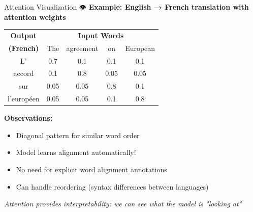 \documentclass[aspectratio=169]{beamer}
\begin{document}
\begin{frame}{Attention Visualization 👁️}
\textbf{Example: English → French translation with attention weights}

\vspace{1em}

\begin{center}
\begin{tabular}{c|cccc}
\textbf{Output} & \multicolumn{4}{c}{\textbf{Input Words}} \\
\textbf{(French)} & The & agreement & on & European \\
\hline
L' & \cellcolor{orange!80}0.7 & 0.1 & 0.1 & 0.1 \\
accord & 0.1 & \cellcolor{orange!80}0.8 & 0.05 & 0.05 \\
sur & 0.05 & 0.05 & \cellcolor{orange!80}0.8 & 0.1 \\
l'européen & 0.05 & 0.05 & 0.1 & \cellcolor{orange!80}0.8 \\
\end{tabular}
\end{center}

\vspace{1em}

\textbf{Observations:}
\begin{itemize}\setlength{\itemsep}{0pt}
    \item Diagonal pattern for similar word order
    \item Model learns alignment automatically!
    \item No need for explicit word alignment annotations
    \item Can handle reordering (syntax differences between languages)
\end{itemize}

\vspace{0.5em}
\textit{Attention provides interpretability: we can see what the model is "looking at"}
\end{frame}
\end{document}
